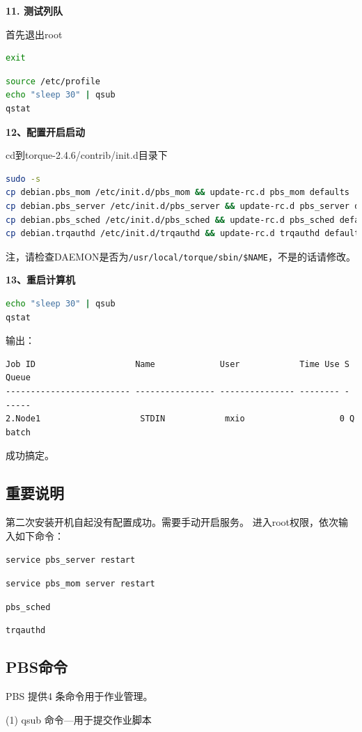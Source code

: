 {\textbf{11. 测试列队}

首先退出root
\begin{lstlisting}[language=sh]
exit
\end{lstlisting}
\begin{lstlisting}[language=sh]
source /etc/profile
echo "sleep 30" | qsub
qstat
\end{lstlisting}

\textbf{12、配置开启启动}

cd到torque-2.4.6/contrib/init.d目录下
\begin{lstlisting}[language=sh]
sudo -s
cp debian.pbs_mom /etc/init.d/pbs_mom && update-rc.d pbs_mom defaults
cp debian.pbs_server /etc/init.d/pbs_server && update-rc.d pbs_server defaults
cp debian.pbs_sched /etc/init.d/pbs_sched && update-rc.d pbs_sched defaults
cp debian.trqauthd /etc/init.d/trqauthd && update-rc.d trqauthd defaults
\end{lstlisting}
注，请检查DAEMON是否为\verb|/usr/local/torque/sbin/$NAME|，不是的话请修改。

\textbf{13、重启计算机}
\begin{lstlisting}[language=sh]
echo "sleep 30" | qsub
qstat
\end{lstlisting}
输出：
\begin{verbatim}
Job ID                    Name             User            Time Use S Queue
------------------------- ---------------- --------------- -------- - -----
2.Node1                    STDIN            mxio                   0 Q batch
\end{verbatim}
成功搞定。



\subsection{重要说明}
第二次安装开机自起没有配置成功。需要手动开启服务。
进入root权限，依次输入如下命令：

\verb|service pbs_server restart|

\verb|service pbs_mom server restart|

\verb|pbs_sched|

\verb|trqauthd|


\subsection{PBS命令}
PBS 提供4 条命令用于作业管理。

(1) qsub 命令—用于提交作业脚本

}
